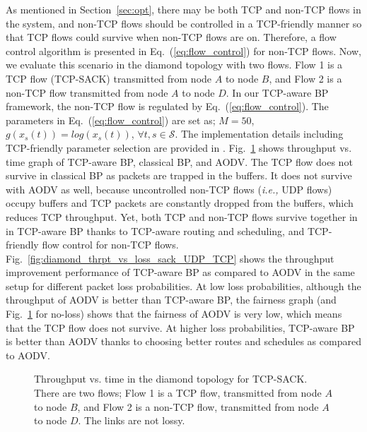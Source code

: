 \documentclass[conference]{IEEEtran}
\newcommand{\ie}{{\em i.e., }}
\newcommand{\Sset}{\mathcal{S}}
\begin{document}
As mentioned in Section~\ref{sec:opt}, there may be both TCP and non-TCP flows in the system, and non-TCP flows should be controlled in a TCP-friendly manner so that TCP flows could survive when non-TCP flows are on. Therefore, a flow control algorithm is presented in Eq.~(\ref{eq:flow_control}) for non-TCP flows. Now, we evaluate this scenario in the diamond topology with two flows. Flow 1 is a TCP flow (TCP-SACK) transmitted from node $A$ to node $B$, and Flow 2 is a non-TCP flow transmitted from node $A$ to node $D$. In our TCP-aware BP framework, the non-TCP flow is regulated by Eq.~(\ref{eq:flow_control}). The parameters in Eq.~(\ref{eq:flow_control}) are set as; $M=50$, $g(x_s(t))=log(x_s(t))$, $\forall t, s \in \Sset$. The implementation details including TCP-friendly parameter selection are provided in \cite{tcp_aware_bp_tech_rep}.
Fig.~\ref{fig:diamond_thrpt_time_results_tcp_udp} shows throughput vs. time graph of TCP-aware BP, classical BP, and AODV. The TCP flow does not survive in classical BP as packets are trapped in the buffers. It does not survive with AODV as well, because uncontrolled non-TCP flows (\ie UDP flows) occupy buffers and TCP packets are constantly dropped from the buffers, which reduces TCP throughput. Yet, both TCP and non-TCP flows survive together in in TCP-aware BP thanks to TCP-aware routing and scheduling, and TCP-friendly flow control for non-TCP flows. Fig.~\ref{fig:diamond_thrpt_vs_loss_sack_UDP_TCP} shows the throughput improvement performance of TCP-aware BP as compared to AODV in the same setup for different packet loss probabilities. At low loss probabilities, although the throughput of AODV is better than TCP-aware BP, the fairness graph (and Fig.~\ref{fig:diamond_thrpt_time_results_tcp_udp} for no-loss) shows that the fairness of AODV is very low, which means that the TCP flow does not survive. At higher loss probabilities, TCP-aware BP is better than AODV thanks to choosing better routes and schedules as compared to AODV.


\begin{figure}[t!]
\vspace{-0pt}
\begin{center}
 \hspace{-0pt}
\end{center}
\begin{center}
\vspace{-5pt}
\caption{\label{fig:diamond_thrpt_time_results_tcp_udp} \scriptsize Throughput vs. time in the diamond topology for TCP-SACK. There are two flows; Flow 1 is a TCP flow, transmitted from node $A$ to node $B$, and Flow 2 is a non-TCP flow, transmitted from node $A$ to node $D$. The links are not lossy.
}
\end{center}
\vspace{-15pt}
\end{figure}
\end{document}
